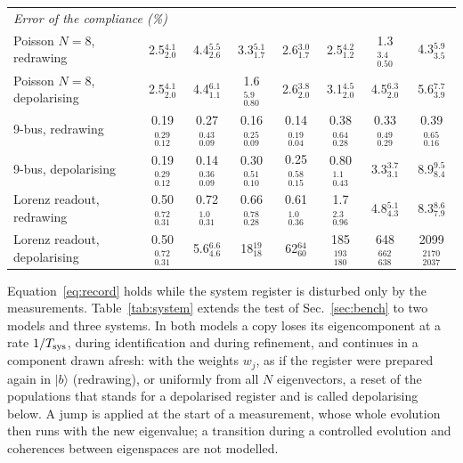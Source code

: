 \documentclass[journal]{IEEEtran}
\begin{document}
\begin{table}[t]
\begin{tabular}{lccccccc}
\midrule
\multicolumn{8}{l}{\emph{Error of the compliance (\%)}}\\
Poisson $N=8$, redrawing & 2.5$_{2.0}^{4.1}$ & 4.4$_{2.6}^{5.5}$ & 3.3$_{1.7}^{5.1}$ & 2.6$_{1.7}^{3.0}$ & 2.5$_{1.2}^{4.2}$ & 1.3$_{0.50}^{3.4}$ & 4.3$_{3.5}^{5.9}$\\
Poisson $N=8$, depolarising & 2.5$_{2.0}^{4.1}$ & 4.4$_{1.1}^{6.1}$ & 1.6$_{0.80}^{5.9}$ & 2.6$_{2.0}^{3.8}$ & 3.1$_{2.0}^{4.5}$ & 4.5$_{2.0}^{6.3}$ & 5.6$_{3.9}^{7.7}$\\
9-bus, redrawing & 0.19$_{0.12}^{0.29}$ & 0.27$_{0.09}^{0.43}$ & 0.16$_{0.09}^{0.25}$ & 0.14$_{0.04}^{0.19}$ & 0.38$_{0.28}^{0.64}$ & 0.33$_{0.29}^{0.49}$ & 0.39$_{0.16}^{0.65}$\\
9-bus, depolarising & 0.19$_{0.12}^{0.29}$ & 0.14$_{0.09}^{0.36}$ & 0.30$_{0.10}^{0.51}$ & 0.25$_{0.15}^{0.58}$ & 0.80$_{0.43}^{1.1}$ & 3.3$_{3.1}^{3.7}$ & 8.9$_{8.4}^{9.5}$\\
Lorenz readout, redrawing & 0.50$_{0.31}^{0.72}$ & 0.72$_{0.31}^{1.0}$ & 0.66$_{0.28}^{0.78}$ & 0.61$_{0.36}^{1.0}$ & 1.7$_{0.96}^{2.3}$ & 4.8$_{4.3}^{5.1}$ & 8.3$_{7.9}^{8.6}$\\
Lorenz readout, depolarising & 0.50$_{0.31}^{0.72}$ & 5.6$_{4.6}^{6.6}$ & 18$_{18}^{19}$ & 62$_{60}^{64}$ & 185$_{180}^{193}$ & 648$_{638}^{662}$ & 2099$_{2037}^{2170}$\\
\bottomrule
\end{tabular}
\end{table}

Equation~\eqref{eq:record} holds while the system register is disturbed only by the measurements. Table~\ref{tab:system} extends the test of Sec.~\ref{sec:bench} to two models and three systems. In both models a copy loses its eigencomponent at a rate $1/T_{\rm sys}$, during identification and during refinement, and continues in a component drawn afresh: with the weights $w_j$, as if the register were prepared again in $|b\rangle$ (redrawing), or uniformly from all $N$ eigenvectors, a reset of the populations that stands for a depolarised register and is called depolarising below. A jump is applied at the start of a measurement, whose whole evolution then runs with the new eigenvalue; a transition during a controlled evolution and coherences between eigenspaces are not modelled.
\end{document}
